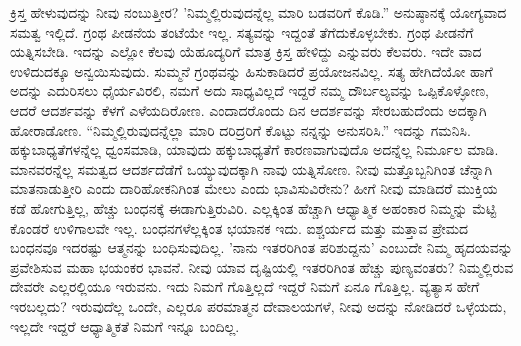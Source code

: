 ಕ್ರಿಸ್ತ ಹೇಳುವುದನ್ನು ನೀವು ನಂಬುತ್ತೀರ? 'ನಿಮ್ಮಲ್ಲಿರುವುದನ್ನೆಲ್ಲ ಮಾರಿ ಬಡವರಿಗೆ ಕೊಡಿ.” ಅನುಷ್ಠಾನಕ್ಕೆ ಯೋಗ್ಯವಾದ ಸಮತ್ವ ಇಲ್ಲಿದೆ. ಗ್ರಂಥ ಪೀಡನೆಯ ತಂಟೆಯೇ ಇಲ್ಲ. ಸತ್ಯವನ್ನು ಇದ್ದಂತೆ ತೆಗೆದುಕೊಳ್ಳಬೇಕು. ಗ್ರಂಥ ಪೀಡನೆಗೆ ಯತ್ನಿಸಬೇಡಿ. ಇದನ್ನು ಎಲ್ಲೋ ಕೆಲವು ಯೆಹೂದ್ಯರಿಗೆ ಮಾತ್ರ ಕ್ರಿಸ್ತ ಹೇಳಿದ್ದು ಎನ್ನುವರು ಕೆಲವರು. ಇದೇ ವಾದ ಉಳಿದುದಕ್ಕೂ ಅನ್ವಯಿಸುವುದು. ಸುಮ್ಮನೆ ಗ್ರಂಥವನ್ನು ಹಿಸುಕಾಡಿದರೆ ಪ್ರಯೋಜನವಿಲ್ಲ. ಸತ್ಯ ಹೇಗಿದೆಯೋ ಹಾಗೆ ಅದನ್ನು ಎದುರಿಸಲು ಧೈರ್ಯವಿರಲಿ, ನಮಗೆ ಅದು ಸಾಧ್ಯವಿಲ್ಲದೆ ಇದ್ದರೆ ನಮ್ಮ ದೌರ್ಬಲ್ಯವನ್ನು ಒಪ್ಪಿಕೊಳ್ಳೋಣ, ಆದರೆ ಆದರ್ಶವನ್ನು ಕೆಳಗೆ ಎಳೆಯದಿರೋಣ. ಎಂದಾದರೊಂದು ದಿನ ಆದರ್ಶವನ್ನು ಸೇರಬಹುದೆಂದು ಅದಕ್ಕಾಗಿ ಹೋರಾಡೋಣ. “ನಿಮ್ಮಲ್ಲಿರುವುದನ್ನೆಲ್ಲಾ ಮಾರಿ ದರಿದ್ರರಿಗೆ ಕೊಟ್ಟು ನನ್ನನ್ನು ಅನುಸರಿಸಿ.'' ಇದನ್ನು ಗಮನಿಸಿ. ಹಕ್ಕುಬಾಧ್ಯತೆಗಳನ್ನೆಲ್ಲ ಧ್ವಂಸಮಾಡಿ, ಯಾವುದು ಹಕ್ಕುಬಾಧ್ಯತೆಗೆ ಕಾರಣವಾಗುವುದೊ ಅದನ್ನೆಲ್ಲ ನಿರ್ಮೂಲ ಮಾಡಿ. ಮಾನವರನ್ನೆಲ್ಲ ಸಮತ್ವದ ಆದರ್ಶದೆಡೆಗೆ ಒಯ್ಯುವುದಕ್ಕಾಗಿ ನಾವು ಯತ್ನಿಸೋಣ. ನೀವು ಮತ್ತೊಬ್ಬನಿಗಿಂತ ಚೆನ್ನಾಗಿ ಮಾತನಾಡುತ್ತೀರಿ ಎಂದು ದಾರಿಹೋಕನಿಗಿಂತ ಮೇಲು ಎಂದು ಭಾವಿಸುವಿರೇನು? ಹೀಗೆ ನೀವು ಮಾಡಿದರೆ ಮುಕ್ತಿಯ ಕಡೆ ಹೋಗುತ್ತಿಲ್ಲ, ಹೆಚ್ಚು ಬಂಧನಕ್ಕೆ ಈಡಾಗುತ್ತಿರುವಿರಿ. ಎಲ್ಲಕ್ಕಿಂತ ಹೆಚ್ಚಾಗಿ ಆಧ್ಯಾತ್ಮಿಕ ಅಹಂಕಾರ ನಿಮ್ಮನ್ನು ಮೆಟ್ಟಿ ಕೊಂಡರೆ ಉಳಿಗಾಲವೇ ಇಲ್ಲ. ಬಂಧನಗಳೆಲ್ಲಕ್ಕಿಂತ ಭಯಾನಕ ಇದು. ಐಶ್ಚರ್ಯದ ಮತ್ತು ಮತ್ತಾವ ಪ್ರೇಮದ ಬಂಧನವೂ ಇದರಷ್ಟು ಆತ್ಮನನ್ನು ಬಂಧಿಸುವುದಿಲ್ಲ. 'ನಾನು ಇತರರಿಗಿಂತ ಪರಿಶುದ್ದನು' ಎಂಬುದೇ ನಿಮ್ಮ ಹೃದಯವನ್ನು ಪ್ರವೇಶಿಸುವ ಮಹಾ ಭಯಂಕರ ಭಾವನೆ. ನೀವು ಯಾವ ದೃಷ್ಟಿಯಲ್ಲಿ ಇತರರಿಗಿಂತ ಹೆಚ್ಚು ಪುಣ್ಯವಂತರು? ನಿಮ್ಮಲ್ಲಿರುವ ದೇವರೇ ಎಲ್ಲರಲ್ಲಿಯೂ ಇರುವನು. ಇದು ನಿಮಗೆ ಗೊತ್ತಿಲ್ಲದೆ ಇದ್ದರೆ ನಿಮಗೆ ಏನೂ ಗೊತ್ತಿಲ್ಲ. ವ್ಯತ್ಯಾಸ ಹೇಗೆ ಇರಬಲ್ಲದು? ಇರುವುದೆಲ್ಲ ಒಂದೇ, ಎಲ್ಲರೂ ಪರಮಾತ್ಮನ ದೇವಾಲಯಗಳೆ, ನೀವು ಅದನ್ನು ನೋಡಿದರೆ ಒಳ್ಳೆಯದು, ಇಲ್ಲದೇ ಇದ್ದರೆ ಆಧ್ಯಾತ್ಮಿಕತೆ ನಿಮಗೆ ಇನ್ನೂ ಬಂದಿಲ್ಲ.

